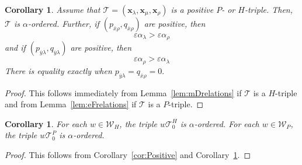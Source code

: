 \documentclass[11pt, reqno]{amsart}
\newtheorem{cor}[thm]{Corollary}
\theoremstyle{remark}
\numberwithin{equation}{subsection}
\numberwithin{figure}{section}
\theoremstyle{customremark}
\newcommand{\Tt}{\mathcal{T}}
\newcommand{\ovx}{{\ov{x}}}
\newcommand{\ovy}{{\ov{y}}}
\newcommand{\ov}{\overline}
\newcommand{\al}{{\alpha}}
\newcommand{\la}{{\lambda}}
\newcommand{\eps}{\varepsilon}
\begin{document}
\begin{cor} \label{cor:ordering}
    Assume that $\Tt=(\bm{x}_\la,\bm{x}_\mu,\bm{x}_\rho)$ is a positive $P$- or $H$-triple. Then, $\Tt$ is $\al$-ordered. 
    Further, if $(p_{\ovx\rho},q_{\ovx\rho})$ are positive, then
    \[ \eps \al_\la >\eps \al_\rho\] and if  $(p_{\ovy\la},q_{\ovy\la})$ are positive, then
    \[ \eps \al_\rho >\eps \al_\la\]
    There is equality exactly when $p_{\ovy\la}=q_{\ovx\rho}=0.$
\end{cor}
\begin{proof}
    This follows immediately from Lemma~\ref{lem:mDrelations} if $\Tt$ is a $H$-triple and from Lemma~\ref{lem:eFrelations} if $\Tt$ is a $P$-triple. 
\end{proof}

\begin{cor} \label{cor:alOrdered} 
For each $w \in \mathcal{W}_H$, the triple $w\Tt_0^H$ is $\al$-ordered. For each $w \in \mathcal{W}_P$, the triple $w\Tt_0^P$ is $\al$-ordered. 
\end{cor} 
\begin{proof}

    This follows from Corollary~\ref{cor:Positive} and Corollary~\ref{cor:ordering}. 
\end{proof}
\end{document}
